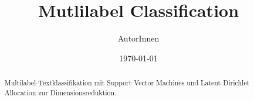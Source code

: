 \documentclass{scrartcl}
\title{Mutlilabel Classification}
\author{AutorInnen}
\date{\today}
\begin{document}
\maketitle

\begin{abstract}
    Multilabel-Textklassifikation mit Support Vector Machines und Latent Dirichlet Allocation zur Dimensionsreduktion.
\end{abstract}

\tableofcontents
\newpage









\nocite{*}
\newpage


\end{document}
